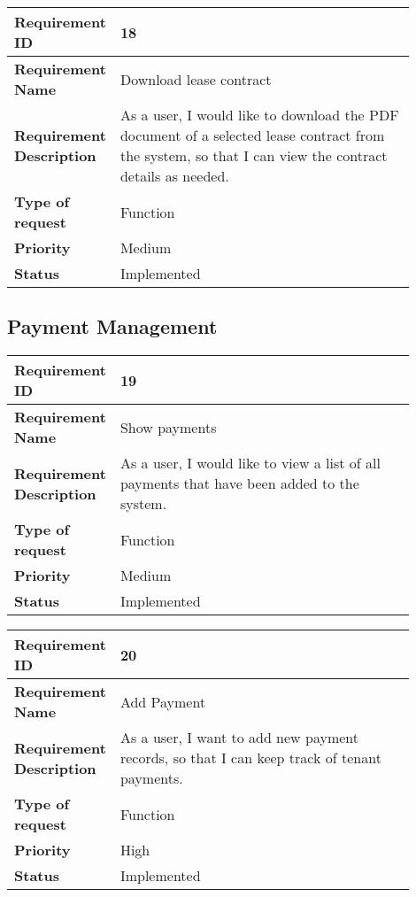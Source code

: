 \begin{table}[htbp]
\centering
\begin{tabular}{|m{0.15\linewidth}|m{0.75\linewidth}|}
\hline
\textbf{Requirement ID} & 18 \\
\hline
\textbf{Requirement Name} & Download lease contract \\
\hline
\textbf{Requirement Description} & As a user, I would like to download the PDF document of a selected lease contract from the system, so that I can view the contract details as needed. \\
\hline
\textbf{Type of request} & Function \\
\hline
\textbf{Priority} & Medium \\
\hline
\textbf{Status} & Implemented \\
\hline
\end{tabular}
\end{table}

\newpage
\subsection{Payment Management}
\begin{table}[htbp]
\centering
\begin{tabular}{|m{0.15\linewidth}|m{0.75\linewidth}|}
\hline
\textbf{Requirement ID} & 19 \\
\hline
\textbf{Requirement Name} & Show payments \\
\hline
\textbf{Requirement Description} & As a user, I would like to view a list of all payments that have been added to the system. \\
\hline
\textbf{Type of request} & Function \\
\hline
\textbf{Priority} & Medium \\
\hline
\textbf{Status} & Implemented \\
\hline
\end{tabular}
\end{table}

\begin{table}[htbp]
\centering
\begin{tabular}{|m{0.15\linewidth}|m{0.75\linewidth}|}
\hline
\textbf{Requirement ID} & 20 \\
\hline
\textbf{Requirement Name} & Add Payment \\
\hline
\textbf{Requirement Description} & As a user, I want to add new payment records, so that I can keep track of tenant payments. \\
\hline
\textbf{Type of request} & Function \\
\hline
\textbf{Priority} & High \\
\hline
\textbf{Status} & Implemented \\
\hline
\end{tabular}
\end{table}

